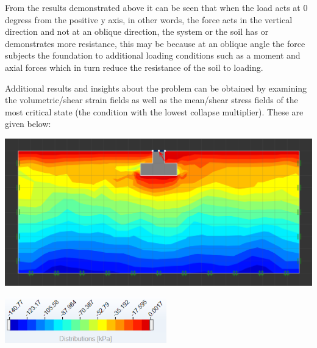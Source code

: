 \documentclass{article}
\begin{document}
\begin{par}
\begin{flushleft}
From the results demonstrated above it can be seen that when the load acts at 0 degress from the positive y axis, in other words, the force acts in the vertical direction and not at an oblique direction, the system or the soil has or demonstrates more resistance, this may be because at an oblique angle the force subjects the foundation to additional loading conditions such as a moment and axial forces which in turn reduce the resistance of the soil to loading.
\end{flushleft}
\end{par}

\begin{par}
\begin{flushleft}
Additional results and insights about the problem can be obtained by examining the volumetric/shear strain fields as well as the mean/shear stress fields of the most critical state (the condition with the lowest collapse multiplier). These are given below:
\end{flushleft}
\end{par}

\vspace{1.3mm}

\begin{par}
\begin{center}
\includegraphics[width=\maxwidth{70.54691419969895em}]{image_3}
\end{center}
\end{par}

\begin{par}
\begin{center}
\includegraphics[width=7cm]{image_4}
\end{center}
\end{par}
\end{document}
